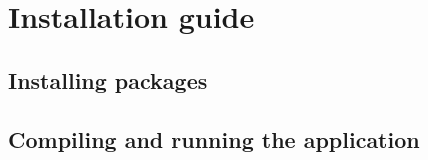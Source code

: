 \chapter*{Installation guide}

\section*{Installing packages}

\section*{Compiling and running the application}